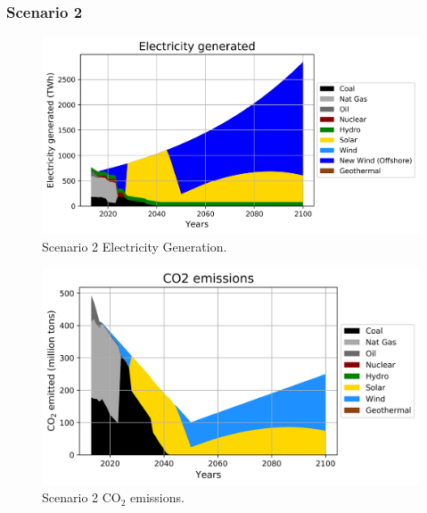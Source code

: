 \begin{frame}
  \frametitle{Scenario 2}
  \begin{figure}[htbp!]
    \begin{center}
      \includegraphics[scale=0.6]{./images/conv_nonuc_elc}
    \end{center}
          \caption{Scenario 2 Electricity Generation.}
    \label{s2e}
  \end{figure}
\end{frame}

\begin{frame}
  \begin{figure}[htbp!]
    \begin{center}
      \includegraphics[scale=0.6]{./images/conv_nonuc_co2}
    \end{center}
          \caption{Scenario 2 CO$_2$ emissions.}
    \label{s2c}
  \end{figure}

\end{frame}
